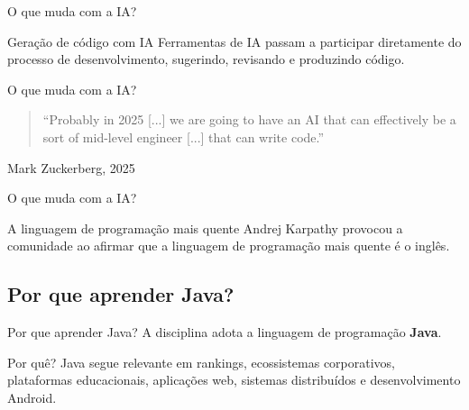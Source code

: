 \begin{frame}{O que muda com a IA?}
\begin{block}{Geração de código com IA}
Ferramentas de IA passam a participar diretamente do processo de desenvolvimento, sugerindo, revisando e produzindo código.
\end{block}

\end{frame}

\begin{frame}{O que muda com a IA?}
\begin{quote}
``Probably in 2025 [...] we are going to have an AI that can effectively be a sort of mid-level engineer [...] that can write code.''
\end{quote}

\hfill Mark Zuckerberg, 2025

\end{frame}

\begin{frame}{O que muda com a IA?}
\begin{block}{A linguagem de programação mais quente}
Andrej Karpathy provocou a comunidade ao afirmar que a linguagem de programação mais quente é o inglês.
\end{block}

\end{frame}

\subsection{Por que aprender Java?}

\begin{frame}{Por que aprender Java?}
A disciplina adota a linguagem de programação \textbf{Java}.

\begin{block}{Por quê?}
Java segue relevante em rankings, ecossistemas corporativos, plataformas educacionais, aplicações web, sistemas distribuídos e desenvolvimento Android.
\end{block}

\end{frame}

